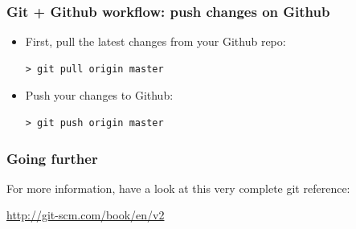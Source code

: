 \documentclass[mathserif, xcolor=dvipsnames]{beamer}
\begin{document}
\begin{frame}[fragile]
    \frametitle{Git + Github workflow: push changes on Github}
    \begin{itemize}
        \item{First, pull the latest changes from your Github repo:
\begin{lstlisting}
> git pull origin master
\end{lstlisting}}
        \item{Push your changes to Github:
\begin{lstlisting}
> git push origin master
\end{lstlisting}}
    \end{itemize}
\end{frame}

\begin{frame}
    \frametitle{Going further}
    For more information, have a look at this very complete git reference:
    \begin{center}
        \url{http://git-scm.com/book/en/v2}
    \end{center}
\end{frame}
\end{document}
